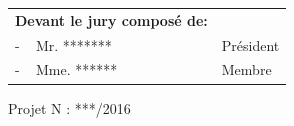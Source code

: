 \begin{table}[h]
    \begin{tabular}{p{6.5cm}p{5cm}}
    \textbf{Devant le jury composé de:}&\\
    - \,\,\, Mr. ******* & Président \\
    - \,\,\, Mme. ****** & Membre \\
    \end{tabular}
\end{table}

\vspace{2cm}
\begin{center}
Projet N : ***/2016
\end{center}

\clearpage
        
        
        
        
    

        
        
